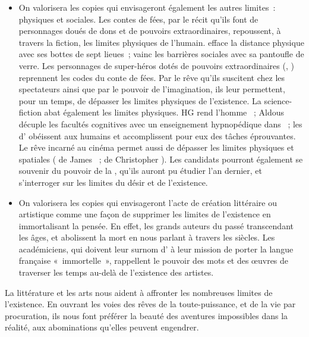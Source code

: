 {\begin{itemize}
\item On valorisera les copies qui envisageront également les autres limites~: physiques et
sociales. Les contes de fées, par le récit qu'ils font de personnages doués de dons et
de pouvoirs extraordinaires, repoussent, à travers la fiction, les limites physiques de
l'humain.  efface la distance physique avec ses bottes de sept lieues~;
 vainc les barrières sociales avec sa pantoufle de verre. Les personnages
de super-héros dotés de pouvoirs extraordinaires (, ) reprennent les
codes du conte de fées. Par le rêve qu'ils suscitent chez les spectateurs ainsi que par
le pouvoir de l'imagination, ils leur permettent, pour un temps, de dépasser les limites physiques de l'existence. La science-fiction abat également les limites physiques. HG 
rend l'homme ~; Aldous  décuple les facultés cognitives avec un
enseignement hypnopédique dans ~; les  d'
obéissent aux humains et accomplissent pour eux des tâches éprouvantes. Le rêve
incarné au cinéma permet aussi de dépasser les limites physiques et spatiales (
de James ~;  de Christopher ). Les candidats pourront
également se souvenir du pouvoir de la , qu'ils auront pu étudier l'an
dernier, et s'interroger sur les limites du désir et de l'existence.

\item On valorisera les copies qui envisageront l'acte de création littéraire ou artistique
comme une façon de supprimer les limites de l'existence en immortalisant la pensée.
En effet, les grands auteurs du passé transcendant les âges, et abolissent la mort en
nous parlant à travers les siècles. Les académiciens, qui doivent leur surnom
d' à leur mission de porter la langue française «~immortelle~», rappellent le
pouvoir des mots et des œuvres de traverser les temps au-delà de l'existence des
artistes.

\end{itemize}
La littérature et les arts nous aident à affronter les nombreuses limites de l'existence.
En ouvrant les voies des rêves de la toute-puissance, et de la vie par procuration, ils
nous font préférer la beauté des aventures impossibles dans la réalité, aux
abominations qu'elles peuvent engendrer.
}%
